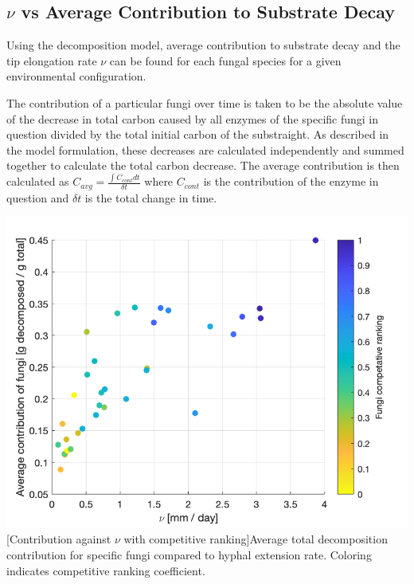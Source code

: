 \documentclass[12pt]{article}
\newenvironment{ColumnFigure}
{\par\medskip\noindent\minipage{\linewidth}}
{\endminipage\par\medskip}
\begin{document}
\begin{multicols}{2}

\subsection{$\nu$ vs Average Contribution to Substrate Decay} %

Using the decomposition model, average contribution to substrate decay and the tip elongation rate $\nu$ can be found for each fungal species for a given environmental configuration. 

The contribution of a particular fungi over time is taken to be the absolute value of the decrease in total carbon caused by all enzymes of the specific fungi in question divided by the total initial carbon of the substraight. As described in the model formulation, these decreases are calculated independently and summed together to calculate the total carbon decrease. The average contribution is then calculated as $C_{avg} = \frac{ \int C_{cont} dt}{\delta t}$ where $C_{cont}$ is the contribution of the enzyme in question and $\delta t$ is the total change in time.

\begin{ColumnFigure}\label{Competitive rankings}
	\centering
	\includegraphics[width=\linewidth]{avg_contr_nu_competative_rankings.png}
	[Contribution against $\nu$ with competitive ranking]{Average total decomposition contribution for specific fungi compared to hyphal extension rate. Coloring indicates competitive ranking coefficient.}
\end{ColumnFigure}


\end{multicols}
\end{document}
